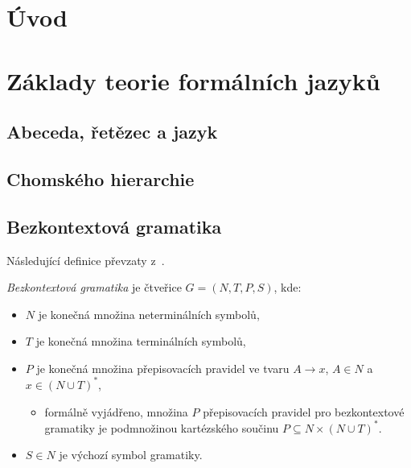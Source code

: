 
%

\chapter{Úvod}\label{kap_uvod}

\chapter{Základy teorie formálních jazyků}\label{kap_teorie}

\section{Abeceda, řetězec a jazyk}
\section{Chomského hierarchie}
\section{Bezkontextová gramatika}\label{kap_bkg}
Následující definice převzaty z~\cite{TIN-opora}.
\begin{definition}\label{def_bkg}
    \emph{Bezkontextová gramatika} je čtveřice $G = (N, T, P, S)$, kde:
    \begin{itemize}
        \item $N$ je konečná množina neterminálních symbolů,
        \item $T$ je konečná množina terminálních symbolů,
        \item $P$ je konečná množina přepisovacích pravidel ve tvaru $A \rightarrow x$, $A \in N$ a $x \in (N \cup T)^*$,
        \begin{itemize}[label=$\iiiint$]
            \item formálně vyjádřeno, množina $P$ přepisovacích pravidel pro bezkontextové gramatiky je podmnožinou kartézského součinu $P \subseteq  N \times (N \cup T)^*$. 
        \end{itemize}
        \item $S \in N$ je výchozí symbol gramatiky.
    \end{itemize}
\end{definition}

